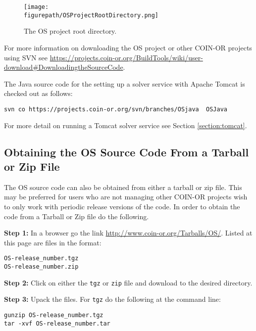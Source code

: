 \documentclass[11pt]{article}
\newcommand{\figurepath}{./figures}
\renewcommand{\_}{{\char"5F}}
\renewcommand{\{}{{\char"7B}}
\renewcommand{\}}{{\char"7D}}
\renewcommand{\^}{{\char"0D}}
\renewcommand{\'}{{\char"0D}}
\begin{document}
\begin{figure}
\centering
\texttt{[image: \\figurepath/OSProjectRootDirectory.png]}
\caption{The OS project root directory.} 
\label{figure:osprojectrootdir}
\end{figure}

For more information on downloading the OS project or other COIN-OR projects using SVN see \url{https://projects.coin-or.org/BuildTools/wiki/user-download#DownloadingtheSourceCode}.

The Java source code for the setting up a solver service with Apache Tomcat is checked out as follows:
\begin{verbatim}
svn co https://projects.coin-or.org/svn/branches/OSjava  OSJava
\end{verbatim}
For more detail on running a Tomcat solver service  see  Section \ref{section:tomcat}.








\subsection{Obtaining the OS Source Code From a Tarball or Zip File}\label{section:getTarBalls}

The OS source code can also be obtained from either a  tarball or zip file.  This may be preferred for users who are not managing other COIN-OR projects wish to only work with periodic release versions of the code.  In order to obtain the code from a Tarball or Zip file do the following. 

\vskip 8pt

{\bf Step 1:} In a browser go the link \url{http://www.coin-or.org/Tarballs/OS/}.  Listed at this page are files in the format:

\begin{verbatim}
OS-release_number.tgz
OS-release_number.zip
\end{verbatim}

\vskip 8pt

{\bf Step 2:} Click on either the {\tt tgz} or {\tt zip} file and download to the desired directory.

\vskip 8pt

{\bf Step 3:} Upack the files. For {\tt tgz} do the following at the command line:
\begin{verbatim}
gunzip OS-release_number.tgz
tar -xvf OS-release_number.tar
\end{verbatim}
\end{document}
